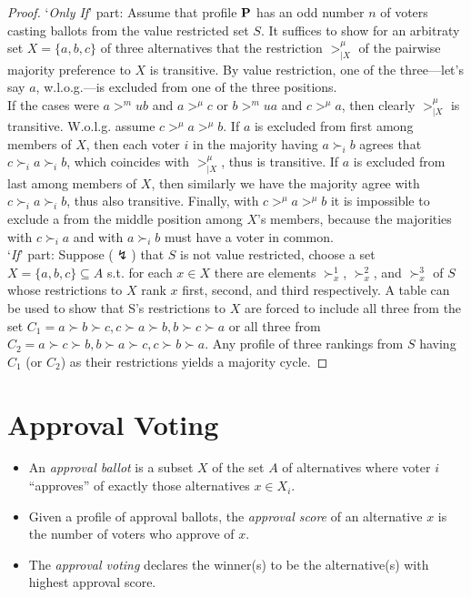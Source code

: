 \begin{proof}
    `\emph{Only If}' part: Assume that profile $\mathbf{P}$ has an odd number $n$ of voters casting ballots from the value restricted set $S$. It suffices to show for an arbitraty set $X = \{a,b,c\}$ of three alternatives that the restriction $>^\mu_{|X}$ of the pairwise majority preference to $X$ is transitive. By value restriction, one of the three---let's say $a$, w.l.o.g.---is excluded from one of the three positions.\\
    If the cases were $a >^mu b$ and $a >^\mu c$ or $b >^mu a$ and $c >^\mu a$, then clearly $>^\mu_{|X}$ is transitive. W.o.l.g. assume $c >^\mu a >^\mu b$. If $a$ is excluded from first among members of $X$, then each voter $i$ in the majority having $a \succ_i b$ agrees that $c \succ_i a \succ_i b$, which coincides with $>^\mu_{|X}$, thus is transitive. If $a$ is excluded from last among members of $X$, then similarly we have the majority agree with $c \succ_i a \succ_i b$, thus also transitive. Finally, with $c >^\mu a >^\mu b$ it is impossible to exclude a from the middle position among $X$'s members, because the majorities with $c \succ_i a$ and with $a \succ_i b$ must have a voter in common.\\
    `\emph{If}' part: Suppose ($\lightning$) that $S$ is not value restricted, choose a set $X = \{a, b, c\} \subseteq A$ s.t. for each $x \in X$ there are elements $\succ^1_x$, $\succ^2_x$, and $\succ^3_x$ of $S$ whose restrictions to $X$ rank $x$ first, second, and third respectively. A table can be used to show that S's restrictions to $X$ are forced to include all three from the set $C_1 ={a \succ b \succ c, c \succ a \succ b, b \succ c \succ a}$ or all three from $C_2 ={a \succ c \succ b, b \succ a \succ c, c \succ b \succ a}$. Any profile of three rankings from $S$ having $C_1$ (or $C_2$) as their restrictions yields a majority cycle.
\end{proof}

\section{Approval Voting}

\begin{definition}
    \begin{itemize}
        \item An \emph{approval ballot} is a subset $X$ of the set $A$ of alternatives where voter $i$ “approves” of exactly those alternatives $x \in X_i$.
        \item Given a profile of approval ballots, the \emph{approval score} of an alternative $x$ is the number of voters who approve of $x$.
        \item The \emph{approval voting} declares the winner(s) to be the alternative(s) with highest approval score.
    \end{itemize}
\end{definition}

